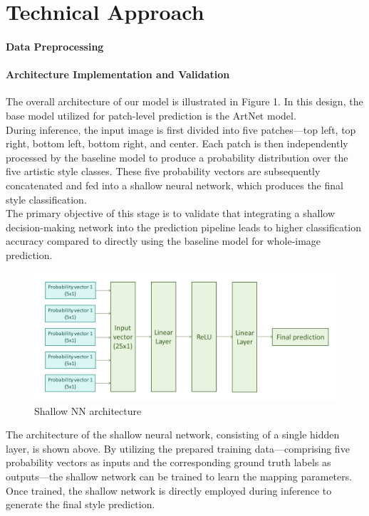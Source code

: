 \section{Technical Approach}
\label{sec:method}
\paragraph{Data Preprocessing}
\paragraph{Architecture Implementation and Validation}
The overall architecture of our model is illustrated in Figure 1. In this design, the base model utilized for patch-level prediction is the ArtNet model.\\
During inference, the input image is first divided into five patches—top left, top right, bottom left, bottom right, and center. Each patch is then independently processed by the baseline model to produce a probability distribution over the five artistic style classes. These five probability vectors are subsequently concatenated and fed into a shallow neural network, which produces the final style classification.\\
The primary objective of this stage is to validate that integrating a shallow decision-making network into the prediction pipeline leads to higher classification accuracy compared to directly using the baseline model for whole-image prediction.
\begin{figure}[h]
    
    \centering
    \includegraphics[width=.45\textwidth]{shallownn.png}
    \caption{Shallow NN architecture}
    \label{fig:main_pipeline}
\end{figure}

The architecture of the shallow neural network, consisting of a single hidden layer, is shown above.
By utilizing the prepared training data—comprising five probability vectors as inputs and the corresponding ground truth labels as outputs—the shallow network can be trained to learn the mapping parameters. Once trained, the shallow network is directly employed during inference to generate the final style prediction.

